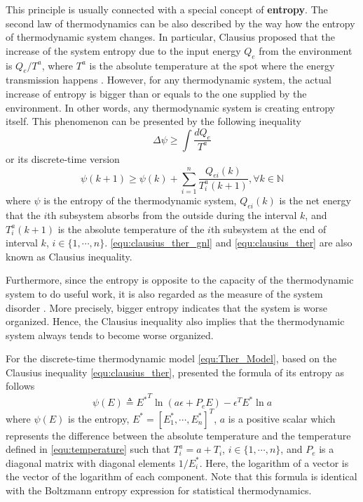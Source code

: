 \documentclass[trsc,nonblindrev]{informs3} %
\renewcommand{\vec}[1]{#1}
\newcommand{\mat}[1]{#1}
\begin{document}
This principle is usually connected with a special concept of
\textbf{entropy}. The second law of thermodynamics can be also
described by the way how the entropy of thermodynamic system changes.
In particular, Clausius proposed that the increase of the system
entropy due to the input energy $Q_e$ from the environment is
$Q_e/T^a$, where $T^a$ is the absolute temperature at the spot where
the energy transmission happens \citep{clausius_mechanical_1867}.
However, for any thermodynamic system, the actual increase of entropy
is bigger than or equals to the one supplied by the environment. In
other words, any thermodynamic system is creating entropy itself.
This phenomenon can be presented by the following inequality
\begin{equation}\label{equ:clausius_ther_gnl}
\Delta \psi \ge \int\frac{dQ_e}{T^a}
\end{equation}
or its discrete-time version \citep{haddad_thermodynamic_2005}
\begin{equation}\label{equ:clausius_ther}
\psi(k+1) \ge \psi(k)+\sum_{i=1}^{n}\frac{Q_{ei}(k)}{T^a_i(k+1)},
\forall k\in\mathbb{N}
\end{equation}
where $\psi$ is the entropy of the thermodynamic system, $Q_{ei}(k)$
is the net energy that the $i$th subsystem absorbs from the outside
during the interval $k$, and $T^a_i(k+1)$ is the absolute temperature
of the $i$th subsystem at the end of interval $k$,
$i\in\{1,\cdots,n\}$. \eqref{equ:clausius_ther_gnl} and
\eqref{equ:clausius_ther} are also known as Clausius inequality.

Furthermore, since the entropy is opposite to the capacity of the
thermodynamic system to do useful work, it is also regarded as the
measure of the system disorder \citep{balmakov_entropy_2001}. More
precisely, bigger entropy indicates that the system is worse
organized. Hence, the Clausius inequality also implies that the
thermodynamic system always tends to become worse organized.

For the discrete-time thermodynamic model \eqref{equ:Ther_Model},
based on the Clausius inequality \eqref{equ:clausius_ther},
\citet{haddad_thermodynamic_2005} presented the formula of its
entropy as follows
\begin{equation}
\psi(\vec{E}) \triangleq{\vec{E}^*}^T \ln
(a\vec{\epsilon}+\mat{P}_e\vec{E}) -\vec{\epsilon}^T\vec{E}^*\ln a
\label{equ:Ther_entropy}
\end{equation}
where $\psi(\vec{E})$ is the entropy,
$\vec{E}^*=[E^*_1,\cdots,E^*_n]^T$, $a$ is a positive scalar which
represents the difference between the absolute temperature and the
temperature defined in \eqref{equ:temperature} such that
$T^a_i=a+T_i$, $i\in\{1,\cdots,n\}$, and $\mat{P}_e$ is a diagonal
matrix with diagonal elements $1/E^*_i$. Here, the logarithm of a
vector is the vector of the logarithm of each component.
Note that this formula is identical with the Boltzmann entropy
expression for statistical thermodynamics. 
\end{document}
